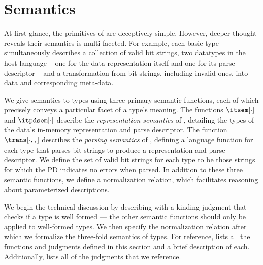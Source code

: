 \section{\ddc{} Semantics}
\label{sec:ddc-sem}


At first glance, the primitives of \ddc{} are deceptively simple.  
However, deeper thought reveals
their semantics is multi-faceted. For example, each basic type
simultaneously describes a
collection of valid bit strings, two datatypes in the host language --
one for the data representation itself and one for its parse
descriptor -- and a transformation from bit strings, including
invalid ones, into data and corresponding meta-data. 


We give semantics to \ddc{} types using three primary
semantic functions, each
of which precisely conveys a particular facet of a type's meaning.
The functions $\itsem[\cdot]$ and $\itpdsem[\cdot]$ describe the {\it
  representation semantics} of \ddc{}, detailing the types of the
data's in-memory representation and parse descriptor. The function
$\trans[\cdot,,]$ describes the {\it parsing semantics} of \ddc{},
defining a \implang{} language function for each type that parses bit
strings to produce a representation and parse descriptor. We define
the set of valid bit strings for each type to be those strings for
which the PD indicates no errors when parsed.  In addition to these
three semantic functions, we define a normalization relation,
which facilitates reasoning about parameterized descriptions.

We begin the technical discussion by describing
with a kinding judgment that checks if a type is well formed
--- the other semantic functions
should only be applied to well-formed \ddc{} types.
We then specify the normalization relation after which we formalize
the three-fold semantics of \ddc{} types.  For reference,
 lists all the functions and judgments defined
in this section and a brief description of each. Additionally,
 lists all of the \fomega{} judgments
that we reference.




